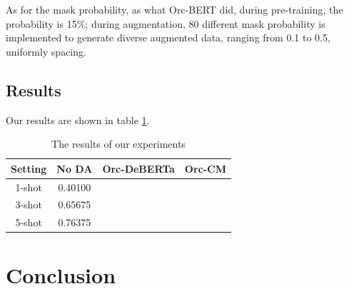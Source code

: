\documentclass{article}
\begin{document}
As for the mask probability, as what Orc-BERT did, during pre-training, the probability is 15\%; during augmentation, 80 different mask probability is implemented to generate diverse augmented data, ranging from 0.1 to 0.5, uniformly spacing.

\subsection{Results}

Our results are shown in table \ref{tab:results}.

\begin{table}[h]
	\centering
	\caption{The results of our experiments}
	\begin{tabular}{cccc}
		\toprule
		Setting & No DA & Orc-DeBERTa & Orc-CM \\
		\midrule
		1-shot & 0.40100 &  &  \\
		3-shot & 0.65675 &  &  \\
		5-shot & 0.76375 &  &  \\
		\bottomrule
	\end{tabular}
	\label{tab:results}
\end{table}

\section{Conclusion}



\end{document}
